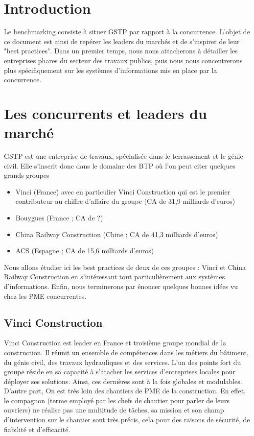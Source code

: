 \section{Introduction}

Le benchmarking consiste à situer GSTP par rapport à la concurrence. L'objet de ce document est ainsi de repérer les leaders du marchés et de s'inspirer de leur "best practices". 
Dans un premier temps, nous nous attacherons à détailler les entreprises phares du secteur des travaux publics, puis nous nous concentrerons plus spécifiquement sur les systèmes d'informations mis en place par la concurrence.

\section{Les concurrents et leaders du marché}
GSTP est une entreprise de travaux, spécialisée dans le terrassement et le génie civil.
Elle s'inscrit donc dans le domaine des BTP où l'on peut citer quelques grands groupes
\begin{itemize}
    \item Vinci (France) avec en particulier Vinci Construction qui est le premier contributeur au chiffre d'affaire du groupe (CA de 31,9 milliards d'euros)
    \item Bouygues (France ; CA de ?)
    \item China Railway Construction (Chine ; CA de 41,3 milliards d'euros)
	\item ACS (Espagne ; CA de 15,6 milliards d'euros)
\end{itemize}

Nous allons étudier ici les best practices de deux de ces groupes : Vinci et China Railway Construction en s'intéressant tout particulièrement aux systèmes d'informations. Enfin, nous terminerons par énoncer quelques bonnes idées vu chez les PME concurrentes.

\subsection{Vinci Construction}
Vinci Construction est leader en France et troisième groupe mondial de la construction.
Il réunit un ensemble de compétences dans les métiers du bâtiment, du génie civil, des travaux hydrauliques et des services.
L'un des points fort du groupe réside en sa capacité à s'atacher les services d'entreprises locales pour déployer ses solutions. Ainsi, ces dernières sont à la fois globales et modulables.
D'autre part, On est très loin des chantiers de PME de la construction. 
En effet, le compagnon (terme employé par les chefs de chantier pour parler de leurs ouvriers) ne réalise pas une multitude de tâches, sa mission et son champ d'intervention sur le chantier sont très précis, cela pour des raisons de sécurité, de fiabilité et d'efficacité.

